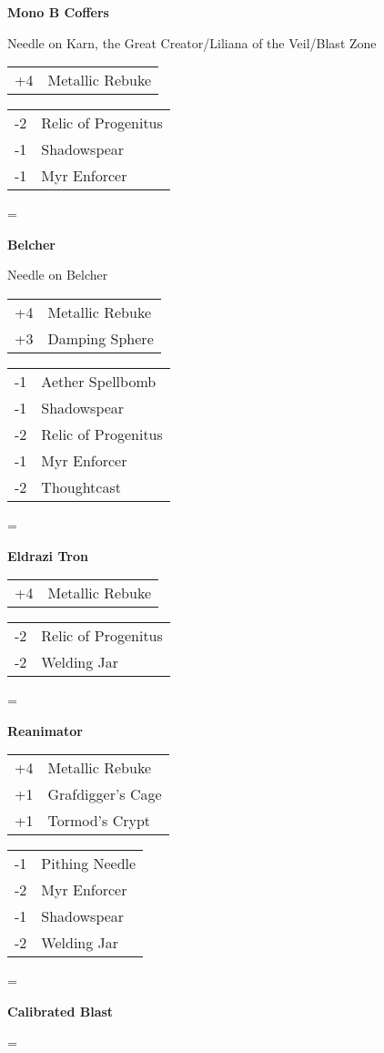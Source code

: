\documentclass[fontsize=12pt,paper=a4]{scrartcl}
\newenvironment{absolutelynopagebreak}
  {\par\nobreak\vfil\penalty0\vfilneg
   \vtop\bgroup}
  {\par\xdef\tpd{\the\prevdepth}\egroup
   \prevdepth=\tpd}
\newenvironment{decklist}{%
    \begin{tabular}{>{\hspace{-4pt}}r<{\hspace{-3pt}}>{\hspace{-3pt}}l<{\hspace{-4pt}}}
    }{%
    \end{tabular}
    \par
}
\newcommand{\card}[2]{#1 & #2\\}
\newenvironment{sideboardguide}{%
    \newpage
    \begin{multicols}{4}
        \begin{tiny}
        }{%
        \end{tiny}
    \end{multicols}
}
\newenvironment{matchup}[1]{%
    \begin{absolutelynopagebreak}
        \textbf{#1}\par
    }{%
    \end{absolutelynopagebreak}
    \par\vspace{2em}
}
\newenvironment{notes}{%
}{%
    \par
}
\begin{document}
\begin{sideboardguide}
\begin{matchup}{Mono B Coffers}
\begin{notes}
            Needle on Karn, the Great Creator/Liliana of the Veil/Blast Zone
        \end{notes}
        \begin{decklist}
            \card{+4}{Metallic Rebuke}
        \end{decklist}
        \begin{decklist}
            \card{-2}{Relic of Progenitus}
            \card{-1}{Shadowspear}
            \card{-1}{Myr Enforcer}
        \end{decklist}
    \end{matchup}
    \begin{matchup}{Belcher}
        \begin{notes}
            Needle on Belcher
        \end{notes}
        \begin{decklist}
            \card{+4}{Metallic Rebuke}
            \card{+3}{Damping Sphere}
        \end{decklist}
        \begin{decklist}
            \card{-1}{Aether Spellbomb}
            \card{-1}{Shadowspear}
            \card{-2}{Relic of Progenitus}
            \card{-1}{Myr Enforcer}
            \card{-2}{Thoughtcast}
        \end{decklist}
    \end{matchup}
    \begin{matchup}{Eldrazi Tron}
        \begin{decklist}
            \card{+4}{Metallic Rebuke}
        \end{decklist}
        \begin{decklist}
            \card{-2}{Relic of Progenitus}
            \card{-2}{Welding Jar}
        \end{decklist}
    \end{matchup}
    \begin{matchup}{Reanimator}
        \begin{decklist}
            \card{+4}{Metallic Rebuke}
            \card{+1}{Grafdigger's Cage}
            \card{+1}{Tormod's Crypt}
        \end{decklist}
        \begin{decklist}
            \card{-1}{Pithing Needle}
            \card{-2}{Myr Enforcer}
            \card{-1}{Shadowspear}
            \card{-2}{Welding Jar}
        \end{decklist}
    \end{matchup}
    \begin{matchup}{Calibrated Blast}

\end{matchup}
\end{sideboardguide}
\end{document}
